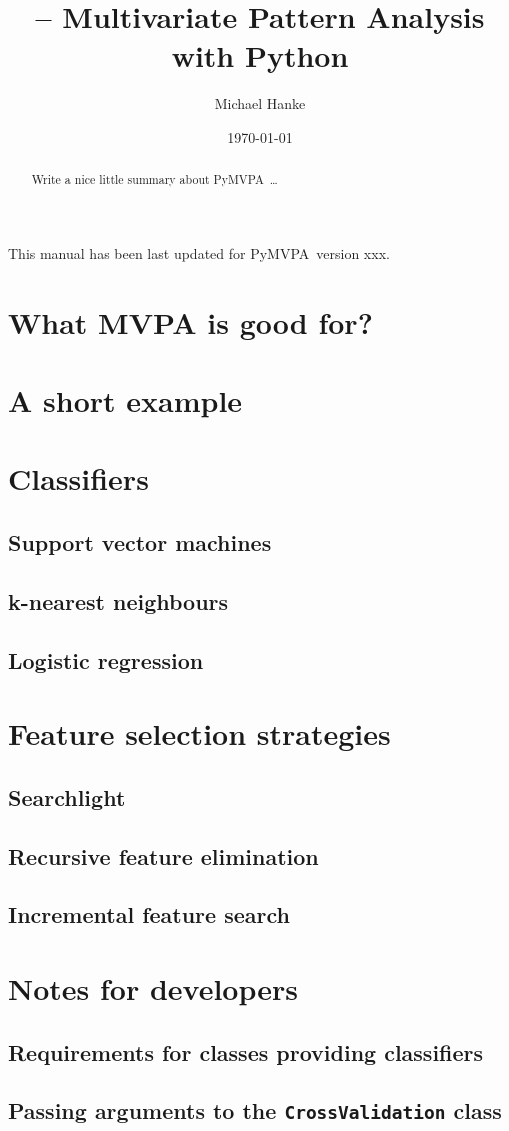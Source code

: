 \documentclass[a4paper,11pt]{scrartcl}
\author{Michael Hanke}
\title{\pymvpa -- Multivariate Pattern Analysis with Python}
\date{\today}
\newcommand{\pymvpa}{PyMVPA~}
\newcommand{\code}[1]{\texttt{#1}}
\begin{document}
\maketitle
\begin{abstract}
Write a nice little summary about \pymvpa\ldots
\end{abstract} 

\begin{center}
This manual has been last updated for \pymvpa version xxx.
\end{center}

\tableofcontents

\section{What MVPA is good for?}
\section{A short example}
\section{Classifiers}
\subsection{Support vector machines}
\subsection{k-nearest neighbours}
\subsection{Logistic regression}
\section{Feature selection strategies}
\subsection{Searchlight}
\subsection{Recursive feature elimination}
\subsection{Incremental feature search}
\section{Notes for developers}
\subsection{Requirements for classes providing classifiers}
\subsection{Passing arguments to the \code{CrossValidation} class}

\printindex
\end{document}
